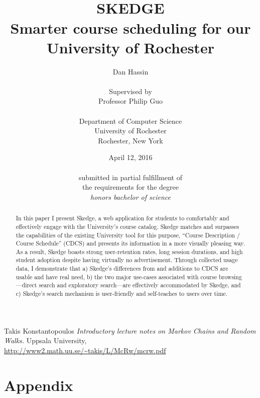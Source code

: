 \documentclass[titlepage]{report}
\title{
\vspace{60pt}\\
\huge \bfseries SKEDGE
\\
\vspace{10pt}
\Large
Smarter course scheduling for our\\
University of Rochester
}
\author{
	Dan Hassin\\
    \vspace{5pt}\\
    Supervised by\\
    Professor Philip Guo\\
    \vspace{2pt}\\
    Department of Computer Science\\
    University of Rochester\\
    Rochester, New York\\
}
\date{April 12, 2016\\
    \vspace{150pt}\\
    submitted in partial fulfillment of\\
    the requirements for the degree\\
    \emph{honors bachelor of science}\\
}
\begin{document}
\maketitle


\onehalfspacing

\setcounter{tocdepth}{1}
\tableofcontents

\listoftables

\listoffigures

\clearpage


\doublespacing


\begin{abstract}

\thispagestyle{plain}

In this paper I present Skedge, a web application for students to comfortably and effectively engage with the University's course catalog. Skedge matches and surpasses the capabilities of the existing University tool for this purpose, ``Course Description / Course Schedule'' (CDCS) and presents its information in a more visually pleasing way. As a result, Skedge boasts strong user-retention rates, long session durations, and high student adoption despite having virtually no advertisement. Through collected usage data, I demonstrate that a) Skedge's differences from and additions to CDCS are usable and have real need, b) the two major use-cases associated with course browsing---direct search and exploratory search---are effectively accommodated by Skedge, and c) Skedge's search mechanism is user-friendly and self-teaches to users over time.

\end{abstract}






\clearpage


\clearpage


\clearpage


\clearpage


\clearpage


\clearpage

\begin{thebibliography}{1}

	 Takis Konstantopoulos {\em Introductory lecture notes on
		Markov Chains and Random Walks.} Uppsala University,
		\\\url{http://www2.math.uu.se/~takis/L/McRw/mcrw.pdf}

\end{thebibliography}


\clearpage
\section*{Appendix}
\end{document}
